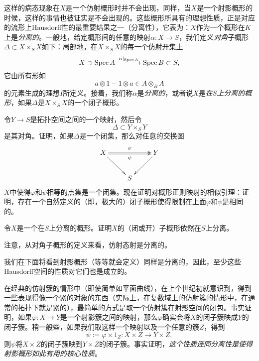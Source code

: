 这样的病态现象在$X$是一个仿射概形时并不会出现，同样，当$X$是一个射影概形的时候，这样的事情也被证实是不会出现的。这些概形所具有的理想性质，正是对应的流形上Hausdorff性的最重要结果之一（分离性），它表为：$X$作为一个概形在$K$上是\textit{分离的}。一般地，给定概形间的任意的映射$\alpha:X\to S$，我们定义\textit{对角}子概形$\Delta\subset X\times_S X$如下：局部地，在$X\times_S X$的每一个仿射开集上
\[
	X\supset \operatorname{Spec} A\xrightarrow{\alpha|_{\operatorname{Spec} A}}\operatorname{Spec} B\subset S,
\]
它由所有形如
\[
a\otimes 1 - 1\otimes a \in A\otimes_B A
\]
的元素生成的理想$I$所定义。接着，我们称$\alpha$是\textit{分离的}，或者说$X$是\textit{在$S$上分离的概形}，如果$\Delta$是$X\times_S X$的一个闭子概形。

\begin{exe}
令$Y\to S$是拓扑空间之间的一个映射，然后令
\[
	\Delta \subset Y\times_S Y
\]
是其对角。证明，如果$\Delta$是一个闭集，那么对任意的交换图
\[
	\xymatrix{
		X\ar@<0.3ex>[rr]^\varphi \ar@<-0.3ex>[rr]_\psi\ar[dr] &&Y\ar[ld]\\
		&S&
	}
\]
$X$中使得$\varphi$和$\psi$相等的点集是一个闭集。现在证明对概形正则映射的相似引理：证明，存在一个自然定义的（即，极大的）闭子概形使得限制在上面$\varphi$和$\psi$是相同的。
\end{exe}

\begin{exe}
	令$X$是一个在$S$上分离的概形。证明$X$的（闭或开）子概形依然在$S$上分离。
\end{exe}

\begin{exe}
	注意，从对角子概形的定义来看，仿射态射是分离的。
\end{exe}

我们在下面将看到射影概形（等等就会定义）同样是分离的，因此，至少这些Hausdorff空间的性质对它们也是成立的。

在经典的仿射簇的情形中（即使简单如平面曲线），在上个世纪初就意识到，得到一些表现得像一个紧的对象的东西（实际上，在复数域上的仿射簇的情形中，在通常的拓扑下就是紧的），最简单的方式是取一个仿射簇在射影空间的闭包。事实证明，如果$\varphi:X\to Y$是一个射影簇之间的映射，那么$\varphi$确实会将$X$的闭子簇映成$Y$的闭子簇。稍一般些，如果我们取这样一个映射以及一个任意的簇$Z$，得到
\[
	\psi:=\varphi\times 1_Z:X\times Z\to Y\times Z,
\]
则$\psi$将$X\times Z$的闭子簇映到$Y\times Z$的闭子簇。事实证明，\textit{这个性质连同分离性是使得射影概形如此有用的核心性质}。